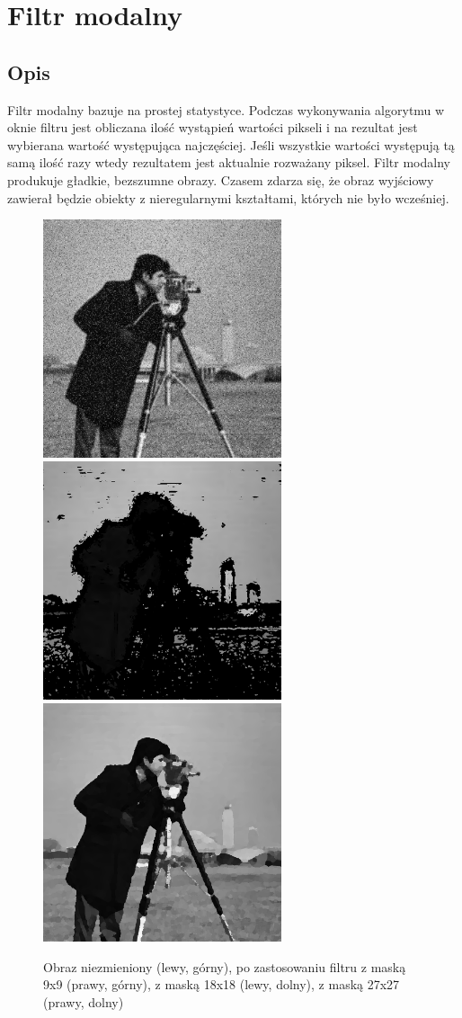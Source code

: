 \documentclass[a4paper,12pt]{book}
\begin{document}
	\section{Filtr modalny}
		\subsection{Opis}
			Filtr modalny bazuje na prostej statystyce. Podczas wykonywania algorytmu w oknie filtru jest obliczana ilość wystąpień wartości pikseli i na rezultat jest wybierana wartość występująca najczęściej. Jeśli wszystkie wartości występują tą samą ilość razy wtedy rezultatem jest aktualnie rozważany piksel. Filtr modalny produkuje gładkie, bezszumne obrazy. Czasem zdarza się, że obraz wyjściowy zawierał będzie obiekty z nieregularnymi kształtami, których nie było wcześniej. 
			\begin{figure}[H]
				\caption{Obraz niezmieniony (lewy, górny), po zastosowaniu filtru z maską 9x9 (prawy, górny), z maską 18x18 (lewy, dolny), z maską 27x27 (prawy, dolny)}
				\includegraphics[width=7cm, height=7cm]{man-noise-unmodified.jpg}
				\includegraphics[width=7cm, height=7cm]{man-filter-modal9x9.png}
				\includegraphics[width=7cm, height=7cm]{man-filter-modal18x18.png}

\end{figure}
\end{document}
